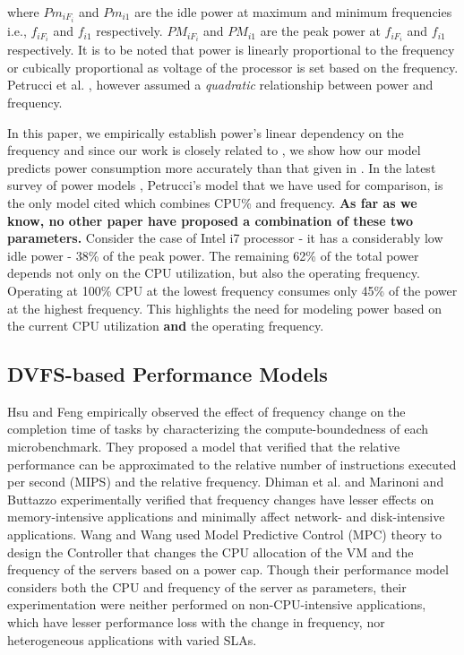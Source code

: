 \documentclass{sig-alternate}
\begin{document}
where $Pm_{iF_i}$ and $Pm_{i1}$ are the idle power at maximum and minimum frequencies i.e., $f_{iF_i}$ and $f_{i1}$ respectively. $PM_{iF_i}$ and $PM_{i1}$ are the peak power at $f_{iF_i}$ and $f_{i1}$ respectively. It is to be noted that power is linearly proportional to the frequency or cubically proportional as voltage of the processor is set based on the frequency. Petrucci et al. \cite{Petrucci2011}, however assumed a \emph{quadratic} relationship between power and frequency. 

In this paper, we empirically establish power's linear dependency on the frequency and since our work is closely related to \cite{Petrucci2011}, we show how our model predicts power consumption more accurately than that given in \cite{Petrucci2011}. In the latest survey of power models \cite{Mobius}, Petrucci's model that we have used for comparison, is the only model cited which combines CPU\% and frequency. \textbf{As far as we know, no other paper have 
proposed a combination of these two parameters.} Consider the case of Intel i7 processor - it has a considerably low idle power - 38\% of the peak power. The remaining 62\% of the total power depends not only on the CPU utilization, but also the operating frequency. Operating at 100\% CPU at the lowest frequency consumes only 45\% of the power at the highest frequency. This highlights the need for modeling power based on the current CPU utilization \textbf{and} the operating frequency.
\subsection{DVFS-based Performance Models}
\label{perf} Hsu and Feng \cite{Hsu2005} empirically observed the effect of frequency change on the completion time of tasks by characterizing the compute-boundedness of each microbenchmark. They proposed a model that verified that the relative performance can be approximated to the relative number of instructions executed per second (MIPS) and the relative frequency. Dhiman et al. \cite{Dhiman2008} and Marinoni and Buttazzo \cite{Marinoni2007} experimentally verified that frequency changes have lesser effects on memory-intensive applications and minimally affect network- and disk-intensive applications. Wang and Wang \cite{Wang2011} used Model Predictive Control (MPC) theory to design the Controller that changes the CPU allocation of the VM and the frequency of the servers based on a power cap. Though their performance model considers both the CPU and frequency of the server as parameters, their experimentation were neither performed on non-CPU-intensive applications, which have lesser performance loss with the change in frequency, nor heterogeneous applications with varied SLAs. 
\end{document}
